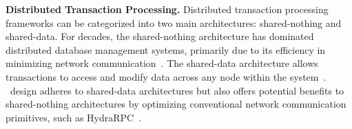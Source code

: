 {\noindent \textbf{Distributed Transaction Processing.}
Distributed transaction processing frameworks can be categorized into two main architectures: shared-nothing and shared-data. For decades, the shared-nothing architecture has dominated distributed database management systems, primarily due to its efficiency in minimizing network communication~\cite{hstore_damon16, citus_sigmod21, memsql_vldb16, voltdb, calvin_sigmod12, dbx1000_dist_vldb17}. 
The shared-data architecture allows transactions to access and modify data across any node within the system~\cite{mtcp_nsdi14, xenic_sosp21, ipipe_sigcomm19, linefs_sosp21, fasst, drtmh, grappa_atc15, mtcp_nsdi14, drtm}. \name~design adheres to shared-data architectures but also offers potential benefits to shared-nothing architectures by optimizing conventional network communication primitives, such as HydraRPC~\cite{hydrarpc_atc24}. 
}








